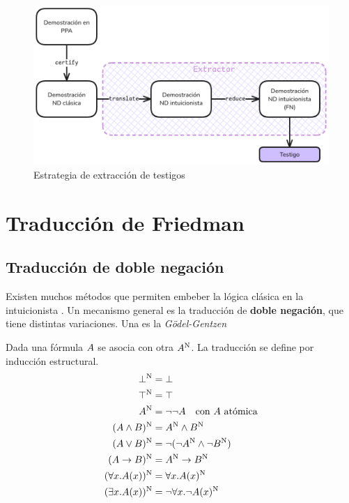 \begin{figure}
    \includegraphics[scale=0.35]{img/fri-extract-strategy.png}
    \centering
    \caption{Estrategia de extracción de testigos}
    \label{fri:fig:strat}
\end{figure}

\section{Traducción de Friedman}

\subsection{Traducción de doble negación}

Existen muchos métodos que permiten embeber la lógica clásica en la
intuicionista . Un mecanismo general es la traducción de
\textbf{doble negación}, que tiene distintas variaciones. Una es la
\textit{Gödel-Gentzen} \cite{Avigad1998-FEFOFD}

\begin{definition} Dada una fórmula $A$
se asocia con otra $A^{\text{N}}$. La traducción se define por inducción
estructural.
    \begin{align*}
        \bot^{\text{N}} &= \bot\\
        \top^{\text{N}} &= \top\\
        A^{\text{N}} &= \neg\neg A \quad \text{con $A$ atómica}\\
        (A \wedge B)^{\text{N}} &= A^{\text{N}} \wedge B^{\text{N}}\\
        (A \vee B)^{\text{N}} &= \neg(\neg A^{\text{N}} \wedge \neg B^{\text{N}})\\
        (A \to B)^{\text{N}} &= A^{\text{N}} \to B^{\text{N}}\\
        (\forall x . A(x))^{\text{N}} &= \forall x . A(x)^{\text{N}}\\
        (\exists x . A(x))^{\text{N}} &= \neg \forall x . \neg A(x)^{\text{N}}
    \end{align*}
\end{definition}


